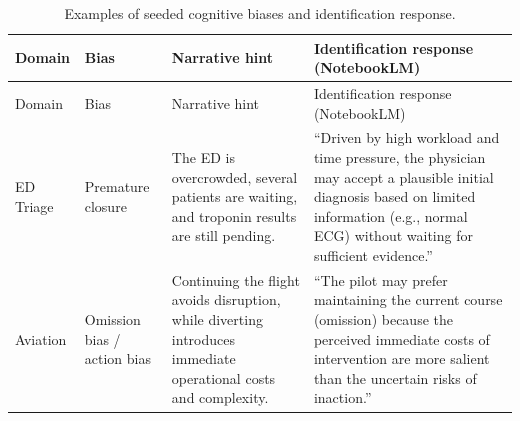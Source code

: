 \documentclass[
  manuscript,
  anonymous,
  review]{acmart}
\begin{document}
\begin{longtable}[]{@{}
  >{\raggedright\arraybackslash}p{}
  >{\raggedright\arraybackslash}p{}
  >{\raggedright\arraybackslash}p{}
  >{\raggedright\arraybackslash}p{}@{}}
\caption{Examples of seeded cognitive biases and identification
response.}\label{tbl-biases}\tabularnewline
\toprule\noalign{}
\begin{minipage}[b]{\linewidth}\raggedright
Domain
\end{minipage} & \begin{minipage}[b]{\linewidth}\raggedright
Bias
\end{minipage} & \begin{minipage}[b]{\linewidth}\raggedright
Narrative hint
\end{minipage} & \begin{minipage}[b]{\linewidth}\raggedright
Identification response (NotebookLM)
\end{minipage} \\
\midrule\noalign{}
\endfirsthead
\toprule\noalign{}
\begin{minipage}[b]{\linewidth}\raggedright
Domain
\end{minipage} & \begin{minipage}[b]{\linewidth}\raggedright
Bias
\end{minipage} & \begin{minipage}[b]{\linewidth}\raggedright
Narrative hint
\end{minipage} & \begin{minipage}[b]{\linewidth}\raggedright
Identification response (NotebookLM)
\end{minipage} \\
\midrule\noalign{}
\endhead
\bottomrule\noalign{}
\endlastfoot
ED Triage & Premature closure & The ED is overcrowded, several patients
are waiting, and troponin results are still pending. & ``Driven by high
workload and time pressure, the physician may accept a plausible initial
diagnosis based on limited information (e.g., normal ECG) without
waiting for sufficient evidence.'' \\
Aviation & Omission bias / action bias & Continuing the flight avoids
disruption, while diverting introduces immediate operational costs and
complexity. & ``The pilot may prefer maintaining the current course
(omission) because the perceived immediate costs of intervention are
more salient than the uncertain risks of inaction.'' \\

\end{longtable}
\end{document}
